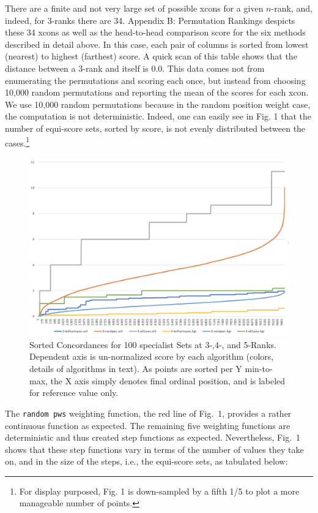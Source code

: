 \documentclass{article}
\begin{document}
There are a finite and not very large set of possible xcons for a given $n$-rank, and, indeed, for 3-ranks there are 34. Appendix B: Permutation Rankings despicts these 34 xcons as well as the head-to-head comparison score for the six methods described in detail above. In this case, each pair of columns is sorted from lowest (nearest) to highest (farthest) score. A quick scan of this table shows that the distance between a 3-rank and itself is 0.0. This data comes not from enumerating the permutations and scoring each once, but instead from choosing 10,000 random permutations and reporting the mean of the scores for each xcon. We use 10,000 random permutations because in the random position weight case, the computation is not deterministic. Indeed, one can easily see in Fig. 1 that the number of equi-score sets, sorted by score, is not evenly distributed between the cases.\footnote{For display purposed, Fig. 1 is down-sampled by a fifth 1/5 to plot a more manageable number of points.}

\begin{figure}[h!]
  \includegraphics[scale=0.5]{"3x10000_subsampled_at_fifth"}
  \caption{Sorted Concordances for 100 specialist Sets at 3-,4-, and 5-Ranks. Dependent axis is un-normalized score by each algorithm (colors, details of algorithms in text). As points are sorted per Y min-to-max, the X axis simply denotes final ordinal position, and is labeled for reference value only.}
\end{figure}


The \texttt{random pws} weighting function, the red line of Fig.~1, provides a rather continuous function as expected. The remaining five weighting functions are deterministic and thus created step functions as expected. Nevertheless, Fig.~1 shows that these step functions vary in terms of the number of values they take on, and in the size of the steps, i.e., the equi-score sets, as tabulated below:
\end{document}
